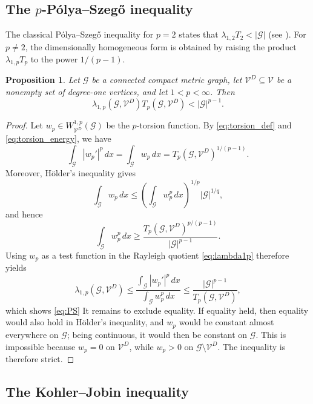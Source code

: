 \documentclass[12pt,a4paper]{article}
\numberwithin{equation}{section}
\newtheorem{proposition}[theorem]{Proposition}
\begin{document}
	\subsection{The \texorpdfstring{$p$}{p}-P\'olya--Szeg\H{o} inequality}
	
	The classical P\'olya--Szeg\H{o} inequality for $p=2$ states that
	$\lambda_{1,2}T_2<|\mathcal G|$ (see \cite[Proposition 5.1]{MuPl}). For $p\neq 2$, the dimensionally homogeneous
	form is obtained by raising the product $\lambda_{1,p}T_p$ to the power
	$1/(p-1)$.
	
	\begin{proposition}
		\label{prop:PS}
		Let $\mathcal G$ be a connected compact metric graph, let
		$\mathcal{V}^D\subseteq \mathcal{V}$ be a nonempty set of degree-one vertices, and let
		$1<p<\infty$. Then
		\begin{equation}
			\label{eq:PS}
			\lambda_{1,p}(\mathcal G,\mathcal{V}^D)T_p(\mathcal G,\mathcal{V}^D)
			<
			|\mathcal G|^{p-1}.
		\end{equation}
	\end{proposition}
	
	\begin{proof}
		Let $w_p\in W^{1,p}_{\mathcal{V}^D}(\mathcal G)$ be the $p$-torsion function. By \eqref{eq:torsion_def} and \eqref{eq:torsion_energy}, we have
		\[
		\int_{\mathcal G}|w_p'|^p\,dx
		=
		\int_{\mathcal G}w_p\,dx
		=
		T_p(\mathcal G,\mathcal{V}^D)^{1/(p-1)}.
		\]
		Moreover, H\"older's inequality gives
		\[
		\int_{\mathcal G}w_p\,dx
		\le
		\left(\int_{\mathcal G}w_p^p\,dx\right)^{1/p}
		|\mathcal G|^{1/q},
		\]
		and hence
		\[
		\int_{\mathcal G}w_p^p\,dx
		\ge
		\frac{T_p(\mathcal G,\mathcal{V}^D)^{p/(p-1)}}{|\mathcal G|^{p-1}}.
		\]
		Using $w_p$ as a test function in the Rayleigh quotient \eqref{eq:lambda1p} therefore yields
		\[
		\lambda_{1,p}(\mathcal G,\mathcal{V}^D)
		\le
		\frac{\int_{\mathcal G}|w_p'|^p\,dx}
		{\int_{\mathcal G}w_p^p\,dx}
		\le
		\frac{|\mathcal G|^{p-1}}{T_p(\mathcal G,\mathcal{V}^D)},
		\]
which shows \eqref{eq:PS}
		It remains to exclude equality. If equality held, then equality would also
		hold in H\"older's inequality, and $w_p$ would be constant almost
		everywhere on $\mathcal G$; being continuous, it would then be constant
		on $\mathcal G$. This is impossible because $w_p=0$ on $\mathcal{V}^D$, while
		$w_p>0$ on $\mathcal G\setminus \mathcal{V}^D$. The inequality is therefore
		strict.
	\end{proof}
	
	\subsection{The Kohler--Jobin inequality}
	
\end{document}
